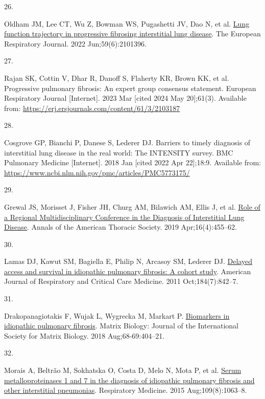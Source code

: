 \documentclass[
]{article}
\newlength{\cslhangindent}
\newlength{\csllabelwidth}
\newenvironment{CSLReferences}[2] %
 {\begin{list}{}{%
  \setlength{\itemindent}{0pt}
  \setlength{\leftmargin}{0pt}
  \setlength{\parsep}{0pt}
  \ifodd #1
   \setlength{\leftmargin}{\cslhangindent}
   \setlength{\itemindent}{-1\cslhangindent}
  \fi
  \setlength{\itemsep}{#2\baselineskip}}}
 {\end{list}}
\newcommand{\CSLLeftMargin}[1]{\parbox[t]{\csllabelwidth}{\strut#1\strut}}
\newcommand{\CSLRightInline}[1]{\parbox[t]{\linewidth - \csllabelwidth}{\strut#1\strut}}
\begin{document}
\begin{CSLReferences}{0}{1}
\CSLLeftMargin{26. }%
\CSLRightInline{Oldham JM, Lee CT, Wu Z, Bowman WS, Pugashetti JV, Dao N, et al. \href{https://doi.org/10.1183/13993003.01396-2021}{Lung function trajectory in progressive fibrosing interstitial lung disease}. The European Respiratory Journal. 2022 Jun;59(6):2101396. }

\CSLLeftMargin{27. }%
\CSLRightInline{Rajan SK, Cottin V, Dhar R, Danoff S, Flaherty KR, Brown KK, et al. Progressive pulmonary fibrosis: An expert group consensus statement. European Respiratory Journal {[}Internet{]}. 2023 Mar {[}cited 2024 May 20{]};61(3). Available from: \url{https://erj.ersjournals.com/content/61/3/2103187}}

\CSLLeftMargin{28. }%
\CSLRightInline{Cosgrove GP, Bianchi P, Danese S, Lederer DJ. Barriers to timely diagnosis of interstitial lung disease in the real world: The {INTENSITY} survey. BMC Pulmonary Medicine {[}Internet{]}. 2018 Jan {[}cited 2022 Apr 22{]};18:9. Available from: \url{https://www.ncbi.nlm.nih.gov/pmc/articles/PMC5773175/}}

\CSLLeftMargin{29. }%
\CSLRightInline{Grewal JS, Morisset J, Fisher JH, Churg AM, Bilawich AM, Ellis J, et al. \href{https://doi.org/10.1513/AnnalsATS.201811-794OC}{Role of a {Regional} {Multidisciplinary} {Conference} in the {Diagnosis} of {Interstitial} {Lung} {Disease}}. Annals of the American Thoracic Society. 2019 Apr;16(4):455--62. }

\CSLLeftMargin{30. }%
\CSLRightInline{Lamas DJ, Kawut SM, Bagiella E, Philip N, Arcasoy SM, Lederer DJ. \href{https://doi.org/10.1164/rccm.201104-0668OC}{Delayed access and survival in idiopathic pulmonary fibrosis: A cohort study}. American Journal of Respiratory and Critical Care Medicine. 2011 Oct;184(7):842--7. }

\CSLLeftMargin{31. }%
\CSLRightInline{Drakopanagiotakis F, Wujak L, Wygrecka M, Markart P. \href{https://doi.org/10.1016/j.matbio.2018.01.023}{Biomarkers in idiopathic pulmonary fibrosis}. Matrix Biology: Journal of the International Society for Matrix Biology. 2018 Aug;68-69:404--21. }

\CSLLeftMargin{32. }%
\CSLRightInline{Morais A, Beltrão M, Sokhatska O, Costa D, Melo N, Mota P, et al. \href{https://doi.org/10.1016/j.rmed.2015.06.003}{Serum metalloproteinases 1 and 7 in the diagnosis of idiopathic pulmonary fibrosis and other interstitial pneumonias}. Respiratory Medicine. 2015 Aug;109(8):1063--8. }


\end{CSLReferences}
\end{document}
